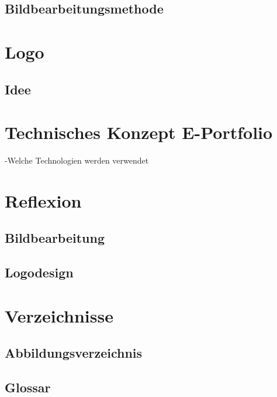 \documentclass[11pt]{article}
\begin{document}

    \subsection{Bildbearbeitungsmethode}



    \section{Logo}


    \subsection{Idee}



    \section{Technisches Konzept E-Portfolio}
    -Welche Technologien werden verwendet



    \section{Reflexion}


    \subsection{Bildbearbeitung}


    \subsection{Logodesign}



    \section{Verzeichnisse}


    \subsection{Abbildungsverzeichnis}


    \subsection{Glossar}
\end{document}
